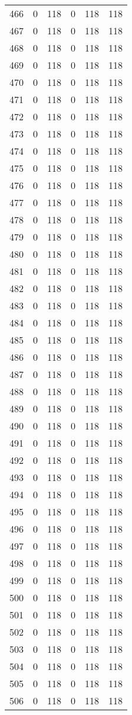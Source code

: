 \documentclass[a4paper]{ctexart}
\begin{document}
\begin{longtable}{p{1cm}|p{2cm}|p{2cm}|p{2cm}|P{2cm}|p{2cm}}
		466&0&118&0&118&118\\
		467&0&118&0&118&118\\
		468&0&118&0&118&118\\
		469&0&118&0&118&118\\
		470&0&118&0&118&118\\
		471&0&118&0&118&118\\
		472&0&118&0&118&118\\
		473&0&118&0&118&118\\
		474&0&118&0&118&118\\
		475&0&118&0&118&118\\
		476&0&118&0&118&118\\
		477&0&118&0&118&118\\
		478&0&118&0&118&118\\
		479&0&118&0&118&118\\
		480&0&118&0&118&118\\
		481&0&118&0&118&118\\
		482&0&118&0&118&118\\
		483&0&118&0&118&118\\
		484&0&118&0&118&118\\
		485&0&118&0&118&118\\
		486&0&118&0&118&118\\
		487&0&118&0&118&118\\
		488&0&118&0&118&118\\
		489&0&118&0&118&118\\
		490&0&118&0&118&118\\
		491&0&118&0&118&118\\
		492&0&118&0&118&118\\
		493&0&118&0&118&118\\
		494&0&118&0&118&118\\
		495&0&118&0&118&118\\
		496&0&118&0&118&118\\
		497&0&118&0&118&118\\
		498&0&118&0&118&118\\
		499&0&118&0&118&118\\
		500&0&118&0&118&118\\
		501&0&118&0&118&118\\
		502&0&118&0&118&118\\
		503&0&118&0&118&118\\
		504&0&118&0&118&118\\
		505&0&118&0&118&118\\
		506&0&118&0&118&118\\

\end{longtable}
\end{document}
